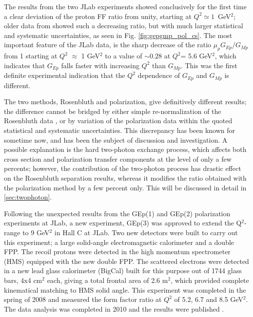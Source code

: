 The results from the two JLab experiments \cite{jones,punjabi05A,gayou:2002} showed 
conclusively for the first time a clear deviation of
the proton FF ratio from unity, starting at $Q^2\simeq 1$~GeV$^2$; older data from \cite{berger,price,bartel,hanson}
showed such a decreasing ratio, but with much larger statistical and systematic uncertainties, as seen in Fig. 
\ref{fig:gepgmp_pol_cs}. 
The most important feature of the JLab data, is the sharp decrease of the ratio
$\mu_p G_{Ep}/G_{Mp}$ from 1 starting at $Q^2$ $\approx$ 1 GeV$^2$ to a value of
$\sim 0.28$ at $Q^2$= 5.6 GeV$^2$, which indicates that $G_{Ep}$ falls 
faster with increasing $Q^2$ than $G_{Mp}$. This was the first definite experimental indication
that the $Q^2$ dependence of $G_{Ep}$ and $G_{Mp}$ is different. 

The two methods, Rosenbluth and polarization,  give definitively 
different results; the difference cannot be bridged by either simple re-normalization 
of the Rosenbluth data \cite{arring03}, or by variation of the polarization data within the 
quoted statistical and systematic uncertainties. This discrepancy has been known
for sometime now, and has been the subject of discussion and investigation. 
A possible explanation is the hard two-photon exchange process, which affects 
both cross section and polarization transfer components at the level of only a few percents; 
however, the contribution of the two-photon process has drastic effect on the  Rosenbluth 
separation results, whereas it modifies the 
ratio obtained with the polarization method by a few percent
only. This will be discussed in detail in \ref{sec:twophoton}.

Following the unexpected results from the GEp(1) and GEp(2) polarization experiments at JLab, a new 
experiment, GEp(3) was approved to extend the Q$^2$-range to 9 GeV$^2$ in Hall C at JLab. 
Two new detectors were built to carry out this experiment; a large solid-angle electromagnetic 
calorimeter and a double FPP. The recoil protons were detected in the 
high momentum spectrometer (HMS) equipped with the new double FPP. The scattered electrons were
detected in a new lead glass calorimeter (BigCal) built for this purpose out of
1744 glass bars, 4x4 cm$^2$ each, giving a total frontal area of 2.6 m$^2$, 
which provided complete kinematical matching to HMS solid angle. 
This experiment was completed in the spring of 2008 and measured the form 
factor ratio at $Q^2$ of 5.2, 6.7 and 8.5 GeV$^2$. The data analysis
was completed in 2010 and the results were published \cite{puckett:2010}. 

